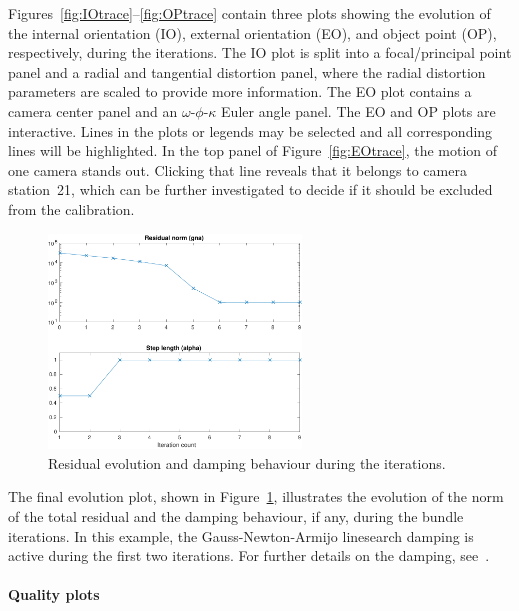 \documentclass{article}
\begin{document}
Figures~\ref{fig:IOtrace}--\ref{fig:OPtrace} contain three plots showing the
evolution of the internal orientation (IO), external orientation (EO),
and object point (OP), respectively, during the iterations. The IO
plot is split into a focal/principal point panel and a radial and
tangential distortion panel, where the radial distortion parameters
are scaled to provide more information. The EO plot contains a camera
center panel and an \(\omega\)-\(\phi\)-\(\kappa\) Euler angle panel. The EO and
OP plots are interactive. Lines in the plots or legends may be
selected and all corresponding lines will be highlighted. In the top
panel of Figure~\ref{fig:EOtrace}, the motion of one camera stands out.
Clicking that line reveals that it belongs to camera station~21,
which can be further investigated to decide if it should be excluded
from the calibration.

\begin{figure}[tbp]
\centering
\includegraphics[width=0.6\textwidth]{./ill/ccamgnatrace.pdf}
\caption{\label{fig:gnatrace}
Residual evolution and damping behaviour during the iterations.}
\end{figure}

The final evolution plot, shown in Figure~\ref{fig:gnatrace},
illustrates the evolution of the norm of the total residual and the
damping behaviour, if any, during the bundle iterations. In this
example, the Gauss-Newton-Armijo linesearch damping is active during
the first two iterations. For further details on the damping,
see~\citet{Borlin2013:Bundle}.

\paragraph{Quality plots}
\label{sec:org6ccc4a5}
\end{document}
